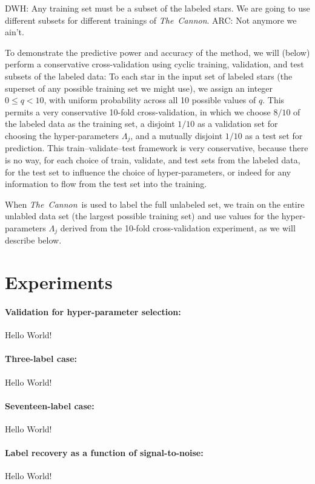 \documentclass[12pt,preprint]{aastex}
\newcommand{\project}[1]{\textsl{#1}}
\newcommand{\TheCannon}{\project{The~Cannon}}
\begin{document}
DWH: Any training set must be a subset of the
labeled stars.
We are going to use different subsets for different trainings of \TheCannon.
ARC: Not anymore we ain't.

To demonstrate the predictive power and accuracy of the method, we
will (below) perform a conservative cross-validation using cyclic
training, validation, and test subsets of the labeled data:
To each star in the input set of labeled stars (the superset of any
possible training set we might use), we assign an integer $0\leq
q<10$, with uniform probability across all 10 possible values of $q$.
This permits a very conservative 10-fold cross-validation, in which we
choose $8/10$ of the labeled data as the training set, a disjoint
$1/10$ as a validation set for choosing the hyper-parameters
$\Lambda_j$, and a mutually disjoint $1/10$ as a test set for
prediction.
This train--validate--test framework is very conservative, because there
is no way, for each choice of train, validate, and test sets from the
labeled data, for the test set to influence the choice of
hyper-parameters, or indeed for any information to flow from the test
set into the training.

When \TheCannon\ is used to label the full unlabeled set, we train on
the entire unlabled data set (the largest possible training set) and
use values for the hyper-parameters $\Lambda_j$ derived from the
10-fold cross-validation experiment, as we will describe below.


\section{Experiments}

\paragraph{Validation for hyper-parameter selection:}
Hello World!

\paragraph{Three-label case:}
Hello World!

\paragraph{Seventeen-label case:}
Hello World!

\paragraph{Label recovery as a function of signal-to-noise:}
Hello World!
\end{document}
